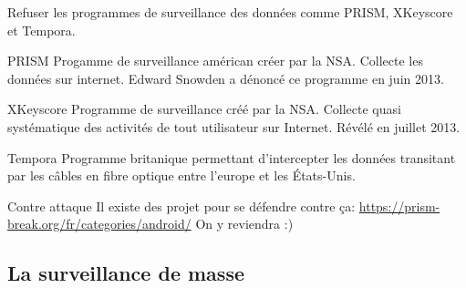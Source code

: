 \documentclass[aspectratio=169]{beamer}
\begin{document}
\begin{frame}{}
Refuser les programmes de surveillance des données comme PRISM, XKeyscore et Tempora.

\begin{tiny}
\begin{block}{PRISM}
Progamme de surveillance américan créer par la NSA. Collecte les données sur internet.
Edward Snowden a dénoncé ce programme en juin 2013.
\end{block}

\begin{block}{XKeyscore}
Programme de surveillance créé par la NSA. Collecte quasi systématique des activités de tout utilisateur sur Internet. Révélé en juillet 2013.
\end{block}

\begin{block}{Tempora}
Programme britanique permettant d'intercepter les données transitant par les câbles en fibre optique 	entre l'europe et les États-Unis.
\end{block}
\end{tiny}
\end{frame}

\begin{frame}{Contre attaque}
Il existe des projet pour se défendre contre ça:
\url{https://prism-break.org/fr/categories/android/}\newline
\newline
On y reviendra :)
\end{frame}

\subsection{La surveillance de masse}

\begin{frame}
\begin{center}
\large{\color{cvp}{La surveillance de masse}}
\end{center}
\end{frame}
\end{document}
